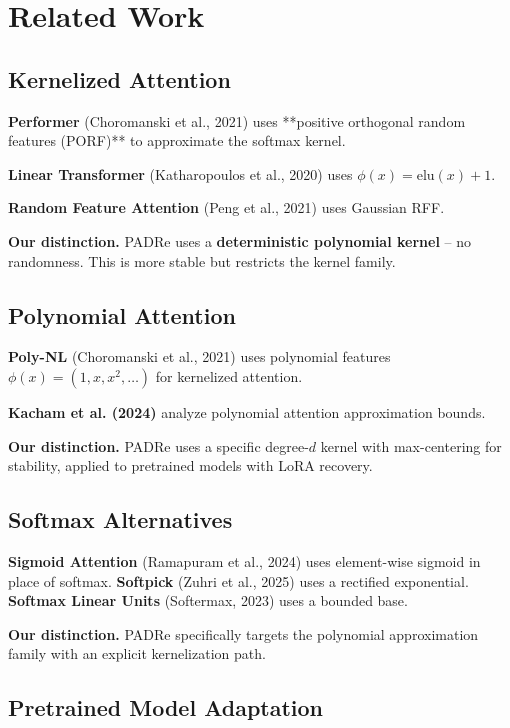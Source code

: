 \section{Related Work}

\subsection{Kernelized Attention}

\textbf{Performer} (Choromanski et al., 2021) uses **positive orthogonal random 
features (PORF)** to approximate the softmax kernel. 

\textbf{Linear Transformer} (Katharopoulos et al., 2020) uses $\phi(x) = \text{elu}(x) + 1$.

\textbf{Random Feature Attention} (Peng et al., 2021) uses Gaussian RFF.

\textbf{Our distinction.} PADRe uses a \textbf{deterministic polynomial kernel} -- no 
randomness. This is more stable but restricts the kernel family.

\subsection{Polynomial Attention}

\textbf{Poly-NL} (Choromanski et al., 2021) uses polynomial features 
$\phi(x) = (1, x, x^2, \dots)$ for kernelized attention. 

\textbf{Kacham et al. (2024)} analyze polynomial attention approximation bounds.

\textbf{Our distinction.} PADRe uses a specific degree-$d$ kernel with max-centering 
for stability, applied to pretrained models with LoRA recovery.

\subsection{Softmax Alternatives}

\textbf{Sigmoid Attention} (Ramapuram et al., 2024) uses element-wise sigmoid 
in place of softmax. \textbf{Softpick} (Zuhri et al., 2025) uses a rectified 
exponential. \textbf{Softmax Linear Units} (Softermax, 2023) uses a bounded base.

\textbf{Our distinction.} PADRe specifically targets the polynomial approximation 
family with an explicit kernelization path.

\subsection{Pretrained Model Adaptation}

